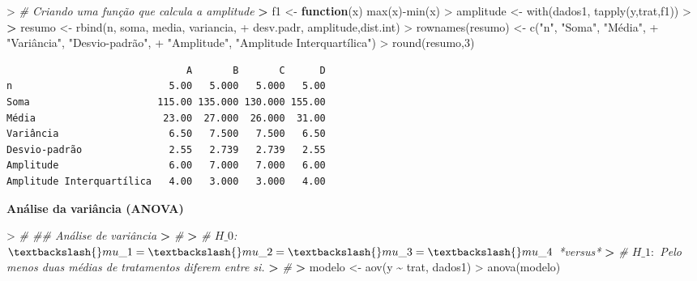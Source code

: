 \documentclass[
]{book}
\newenvironment{Shaded}{\begin{snugshade}}{\end{snugshade}}
\newcommand{\CommentTok}[1]{\textcolor[rgb]{0.56,0.35,0.01}{\textit{#1}}}
\newcommand{\ControlFlowTok}[1]{\textcolor[rgb]{0.13,0.29,0.53}{\textbf{#1}}}
\newcommand{\DecValTok}[1]{\textcolor[rgb]{0.00,0.00,0.81}{#1}}
\newcommand{\ErrorTok}[1]{\textcolor[rgb]{0.64,0.00,0.00}{\textbf{#1}}}
\newcommand{\FunctionTok}[1]{\textcolor[rgb]{0.00,0.00,0.00}{#1}}
\newcommand{\NormalTok}[1]{#1}
\newcommand{\OtherTok}[1]{\textcolor[rgb]{0.56,0.35,0.01}{#1}}
\newcommand{\SpecialCharTok}[1]{\textcolor[rgb]{0.00,0.00,0.00}{#1}}
\newcommand{\StringTok}[1]{\textcolor[rgb]{0.31,0.60,0.02}{#1}}
\begin{document}
\begin{Shaded}
\begin{Highlighting}[]
\SpecialCharTok{\textgreater{}} \CommentTok{\#\textquotesingle{} Criando uma função que calcula a amplitude}
\ErrorTok{\textgreater{}}\NormalTok{ f1 }\OtherTok{\textless{}{-}} \ControlFlowTok{function}\NormalTok{(x) }\FunctionTok{max}\NormalTok{(x)}\SpecialCharTok{{-}}\FunctionTok{min}\NormalTok{(x)}
\SpecialCharTok{\textgreater{}}\NormalTok{ amplitude }\OtherTok{\textless{}{-}} \FunctionTok{with}\NormalTok{(dados1, }\FunctionTok{tapply}\NormalTok{(y,trat,f1))}
\SpecialCharTok{\textgreater{}} 
\ErrorTok{\textgreater{}}\NormalTok{ resumo }\OtherTok{\textless{}{-}} \FunctionTok{rbind}\NormalTok{(n, soma, media, variancia,}
\SpecialCharTok{+}\NormalTok{                 desv.padr, amplitude,dist.int)}
\SpecialCharTok{\textgreater{}} \FunctionTok{rownames}\NormalTok{(resumo) }\OtherTok{\textless{}{-}} \FunctionTok{c}\NormalTok{(}\StringTok{"n"}\NormalTok{, }\StringTok{"Soma"}\NormalTok{, }\StringTok{"Média"}\NormalTok{, }
\SpecialCharTok{+}                       \StringTok{"Variância"}\NormalTok{, }\StringTok{"Desvio{-}padrão"}\NormalTok{, }
\SpecialCharTok{+}                       \StringTok{"Amplitude"}\NormalTok{, }\StringTok{"Amplitude Interquartílica"}\NormalTok{)}
\SpecialCharTok{\textgreater{}} \FunctionTok{round}\NormalTok{(resumo,}\DecValTok{3}\NormalTok{)}
\end{Highlighting}
\end{Shaded}

\begin{verbatim}
                               A       B       C      D
n                           5.00   5.000   5.000   5.00
Soma                      115.00 135.000 130.000 155.00
Média                      23.00  27.000  26.000  31.00
Variância                   6.50   7.500   7.500   6.50
Desvio-padrão               2.55   2.739   2.739   2.55
Amplitude                   6.00   7.000   7.000   6.00
Amplitude Interquartílica   4.00   3.000   3.000   4.00
\end{verbatim}

\textbf{Análise da variância (ANOVA)}

\begin{Shaded}
\begin{Highlighting}[]
\SpecialCharTok{\textgreater{}} \CommentTok{\#\textquotesingle{} \#\# Análise de variância  }
\ErrorTok{\textgreater{}} \CommentTok{\#\textquotesingle{} }
\ErrorTok{\textgreater{}} \CommentTok{\#\textquotesingle{} $H\_0$: $\textbackslash{}mu\_1 = \textbackslash{}mu\_2 = \textbackslash{}mu\_3 = \textbackslash{}mu\_4$ *versus* }
\ErrorTok{\textgreater{}} \CommentTok{\#\textquotesingle{} $H\_1:$ Pelo menos duas médias de tratamentos diferem entre si.}
\ErrorTok{\textgreater{}} \CommentTok{\#\textquotesingle{} }
\ErrorTok{\textgreater{}}\NormalTok{ modelo }\OtherTok{\textless{}{-}} \FunctionTok{aov}\NormalTok{(y }\SpecialCharTok{\textasciitilde{}}\NormalTok{ trat, dados1)}
\SpecialCharTok{\textgreater{}} \FunctionTok{anova}\NormalTok{(modelo)}
\end{Highlighting}
\end{Shaded}
\end{document}
